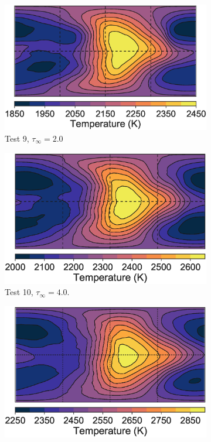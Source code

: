 \begin{figure}
  \begin{subfigure}[t]{0.32\textwidth}
    \includegraphics[width=\textwidth]{figures/linking-climate-55cnce/5sh_2_halfp.eps}
    \caption{Test 9, $\tau_{\infty} = 2.0$}
    \label{fig:free-u-shear}
  \end{subfigure}
\enskip
  \begin{subfigure}[t]{0.32\textwidth}
    \includegraphics[width=\textwidth]{figures/linking-climate-55cnce/H2N2_5_halfp.eps}
    \caption{Test 10, $\tau_{\infty} = 4.0$.}
    \label{fig:free-v-shear}
  \end{subfigure}
\enskip
  \begin{subfigure}[t]{0.32\textwidth}
    \includegraphics[width=\textwidth]{figures/linking-climate-55cnce/5sh_8_halfp.eps}

\end{subfigure}
\end{figure}
